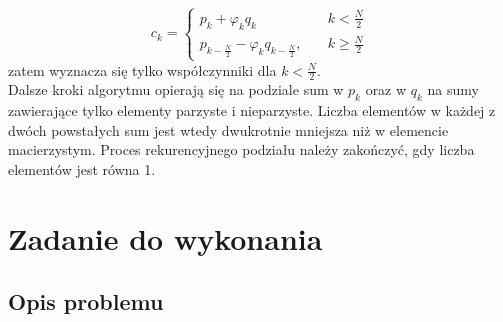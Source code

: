 \begin{equation}
c_k = 
\begin{cases}
p_k + \varphi_k q_k \quad &k < \frac{N}{2}\\
p_{k -\frac{N}{2}} - \varphi_k q_{k -\frac{N}{2}}, \quad &k \geq \frac{N}{2}
\end{cases}
\end{equation}
zatem wyznacza się tylko współczynniki dla $ k < \frac{N}{2} $.\\
Dalsze kroki algorytmu opierają się na podziale sum w $ p_k $ oraz w $ q_k $ na sumy zawierające tylko elementy parzyste i nieparzyste. Liczba elementów w każdej z dwóch powstałych sum jest wtedy dwukrotnie mniejsza niż w elemencie macierzystym. Proces rekurencyjnego podziału należy zakończyć, gdy liczba elementów jest równa 1.

\section{Zadanie do wykonania}

\subsection{Opis problemu}

